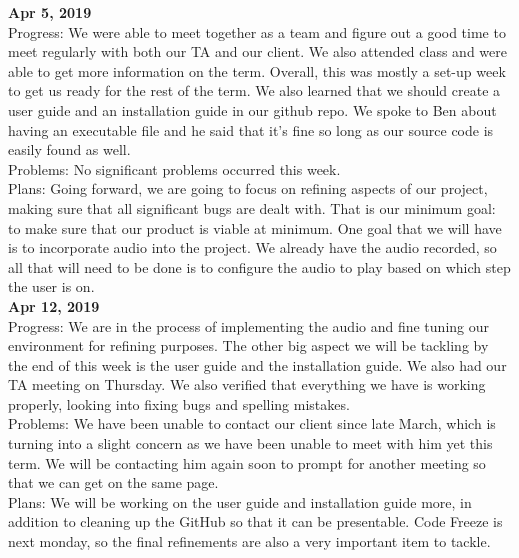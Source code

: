 \textbf{Apr 5, 2019}\\
Progress: We were able to meet together as a team and figure out a good time to meet regularly with both our TA and our client. We also attended class and were able to get more information on the term. Overall, this was mostly a set-up week to get us ready for the rest of the term. We also learned that we should create a user guide and an installation guide in our github repo. We spoke to Ben about having an executable file and he said that it's fine so long as our source code is easily found as well.
\\
Problems: No significant problems occurred this week.
\\
Plans: Going forward, we are going to focus on refining aspects of our project, making sure that all significant bugs are dealt with. That is our minimum goal: to make sure that our product is viable at minimum. One goal that we will have is to incorporate audio into the project. We already have the audio recorded, so all that will need to be done is to configure the audio to play based on which step the user is on.
\\

\textbf{Apr 12, 2019}\\
Progress: We are in the process of implementing the audio and fine tuning our environment for refining purposes. The other big aspect we will be tackling by the end of this week is the user guide and the installation guide. We also had our TA meeting on Thursday. We also verified that everything we have is working properly, looking into fixing bugs and spelling mistakes. 
\\
Problems: We have been unable to contact our client since late March, which is turning into a slight concern as we have been unable to meet with him yet this term. We will be contacting him again soon to prompt for another meeting so that we can get on the same page. 
\\
Plans: We will be working on the user guide and installation guide more, in addition to cleaning up the GitHub so that it can be presentable. Code Freeze is next monday, so the final refinements are also a very important item to tackle. 
\\

